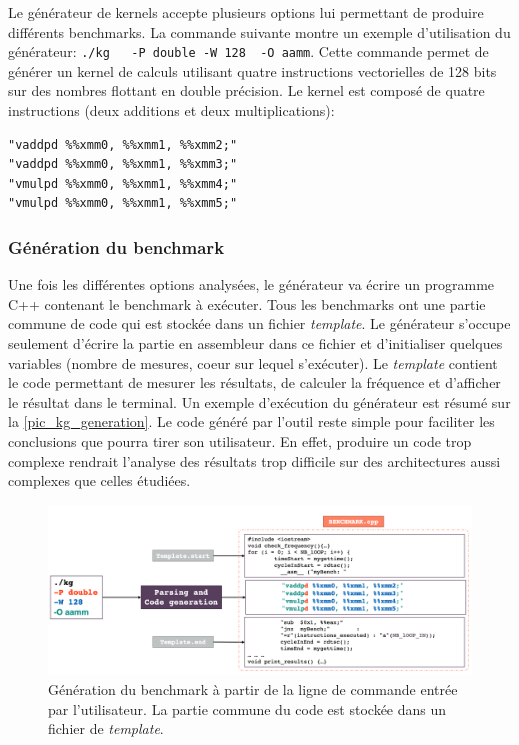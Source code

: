             Le générateur de kernels accepte plusieurs options lui permettant de produire différents benchmarks. La commande suivante montre un exemple d'utilisation du générateur: \verb|./kg   -P double -W 128  -O aamm|. Cette commande permet de générer un kernel de calculs utilisant quatre instructions vectorielles de 128 bits sur des nombres flottant en double précision. Le kernel est composé de quatre instructions (deux additions et deux multiplications):
        \begin{verbatim}
"vaddpd %%xmm0, %%xmm1, %%xmm2;"
"vaddpd %%xmm0, %%xmm1, %%xmm3;"
"vmulpd %%xmm0, %%xmm1, %%xmm4;"
"vmulpd %%xmm0, %%xmm1, %%xmm5;"
        \end{verbatim}
        
      
        
    
    \subsubsection{Génération du benchmark}
        
        Une fois les différentes options analysées, le générateur va écrire un programme C++ contenant le benchmark à exécuter. Tous les benchmarks ont une partie commune de code qui est stockée dans un fichier \textit{template}. Le générateur s'occupe seulement d'écrire la partie en assembleur dans ce fichier et d'initialiser quelques variables (nombre de mesures, coeur sur lequel s'exécuter). Le \textit{template} contient le code permettant de mesurer les résultats, de calculer la fréquence et d'afficher le résultat  dans le terminal. Un exemple d'exécution du générateur est résumé sur la \autoref{pic_kg_generation}. Le code généré par l'outil reste simple pour faciliter les conclusions que pourra tirer son utilisateur. En effet, produire un code trop complexe rendrait l'analyse des résultats trop difficile sur des  architectures aussi complexes que celles étudiées. 

        \begin{figure}[h!]
            \center
            \includegraphics[width=16cm]{images/kg_generation.png}
            \caption{\label{pic_kg_generation}Génération du benchmark à partir de la ligne de commande entrée par l'utilisateur. La partie commune du code est stockée dans un fichier de \textit{template}.}
        \end{figure}
        

